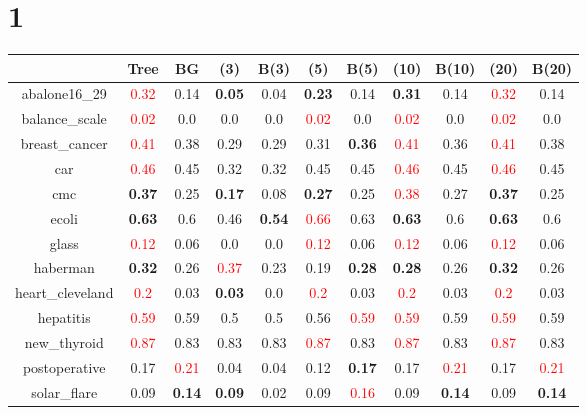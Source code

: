 \documentclass{article}%
\begin{document}
\section*{1}%
\begin{tabular}{c|cccccccccc}%
\hline%
&Tree&BG&(3)&B(3)&(5)&B(5)&(10)&B(10)&(20)&B(20)\\%
\hline%
abalone16\_29&\textcolor{red}{ 
0.32
}&0.14&\textbf{0.05}&0.04&\textbf{0.23}&0.14&\textbf{0.31}&0.14&\textcolor{red}{ 
0.32
}&0.14\\%
\hline%
balance\_scale&\textcolor{red}{ 
0.02
}&0.0&0.0&0.0&\textcolor{red}{ 
0.02
}&0.0&\textcolor{red}{ 
0.02
}&0.0&\textcolor{red}{ 
0.02
}&0.0\\%
\hline%
breast\_cancer&\textcolor{red}{ 
0.41
}&0.38&0.29&0.29&0.31&\textbf{0.36}&\textcolor{red}{ 
0.41
}&0.36&\textcolor{red}{ 
0.41
}&0.38\\%
\hline%
car&\textcolor{red}{ 
0.46
}&0.45&0.32&0.32&0.45&0.45&\textcolor{red}{ 
0.46
}&0.45&\textcolor{red}{ 
0.46
}&0.45\\%
\hline%
cmc&\textbf{0.37}&0.25&\textbf{0.17}&0.08&\textbf{0.27}&0.25&\textcolor{red}{ 
0.38
}&0.27&\textbf{0.37}&0.25\\%
\hline%
ecoli&\textbf{0.63}&0.6&0.46&\textbf{0.54}&\textcolor{red}{ 
0.66
}&0.63&\textbf{0.63}&0.6&\textbf{0.63}&0.6\\%
\hline%
glass&\textcolor{red}{ 
0.12
}&0.06&0.0&0.0&\textcolor{red}{ 
0.12
}&0.06&\textcolor{red}{ 
0.12
}&0.06&\textcolor{red}{ 
0.12
}&0.06\\%
\hline%
haberman&\textbf{0.32}&0.26&\textcolor{red}{ 
0.37
}&0.23&0.19&\textbf{0.28}&\textbf{0.28}&0.26&\textbf{0.32}&0.26\\%
\hline%
heart\_cleveland&\textcolor{red}{ 
0.2
}&0.03&\textbf{0.03}&0.0&\textcolor{red}{ 
0.2
}&0.03&\textcolor{red}{ 
0.2
}&0.03&\textcolor{red}{ 
0.2
}&0.03\\%
\hline%
hepatitis&\textcolor{red}{ 
0.59
}&0.59&0.5&0.5&0.56&\textcolor{red}{ 
0.59
}&\textcolor{red}{ 
0.59
}&0.59&\textcolor{red}{ 
0.59
}&0.59\\%
\hline%
new\_thyroid&\textcolor{red}{ 
0.87
}&0.83&0.83&0.83&\textcolor{red}{ 
0.87
}&0.83&\textcolor{red}{ 
0.87
}&0.83&\textcolor{red}{ 
0.87
}&0.83\\%
\hline%
postoperative&0.17&\textcolor{red}{ 
0.21
}&0.04&0.04&0.12&\textbf{0.17}&0.17&\textcolor{red}{ 
0.21
}&0.17&\textcolor{red}{ 
0.21
}\\%
\hline%
solar\_flare&0.09&\textbf{0.14}&\textbf{0.09}&0.02&0.09&\textcolor{red}{ 
0.16
}&0.09&\textbf{0.14}&0.09&\textbf{0.14}\\%

\end{tabular}
\end{document}
